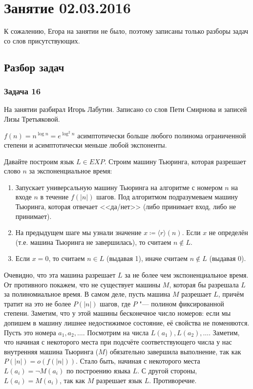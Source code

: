 \chapter{Занятие 02.03.2016}

К сожалению, Егора на занятии не было, поэтому записаны только разборы задач
со слов присутствующих.

\section{Разбор задач}
\subsection{Задача 16}\label{prob16}
	На занятии разбирал Игорь Лабутин.
	Записано со слов Пети Смирнова и записей Лизы Третьяковой.

	\begin{assertion}
		$f(n)=n^{\log n}=e^{\log^2 n}$ асимптотически больше любого полинома ограниченной степени
		и асимптотически меньше любой экспоненты.
	\end{assertion}
	Давайте построим язык $L \in EXP$.
	Строим машину Тьюринга, которая разрешает слово $n$ за экспоненциальное время:
	\begin{enumerate}
		\item
			Запускает универсальную машину Тьюринга на алгоритме с номером $n$ на входе $n$ в течение $f(|n|)$ шагов.
			Под алгоритмом подразумеваем машину Тьюринга, которая отвечает <<да/нет>> (либо принимает вход, либо не принимает).
		\item
			На предыдущем шаге мы узнали значение $x \coloneq \langle r \rangle(n)$.
			Если $x$ не определён (т.е. машина Тьюринга не завершилась), то считаем $n \notin L$.
		\item
			Если $x=0$, то считаем $n \in L$ (выдавая 1), иначе считаем $n \notin L$ (выдавая 0).
	\end{enumerate}
	Очевидно, что эта машина разрешает $L$ за не более чем экспоненциальное время.
	От противного покажем, что не существует машины $M$, которая бы разрешала $L$ за полиномиальное время.
	В самом деле, пусть машина $M$ разрешает $L$, причём тратит на это не более $P(|n|)$ шагов,
	где $P$ "--- полином фиксированной степени.
	Заметим, что у этой машины бесконечное число номеров: если мы допишем в машину лишнее недостижимое состояние,
	её свойства не поменяются.
	Пусть это номера $a_1, a_2, \dots$.
	Посмотрим на числа $L(a_1), L(a_2), \dots$.
	Заметим, что начиная с некоторого места при подсчёте соответствующего числа у нас внутренняя машина Тьюринга ($M$)
	обязательно завершила выполнение, так как $P(|n|)=o(f(|n|))$.
	Стало быть, начиная с некоторого места $L(a_i)=\lnot M(a_i)$ по построению языка $L$.
	С другой стороны, $L(a_i)=M(a_i)$, так как $M$ разрешает язык $L$.
	Противоречие.

